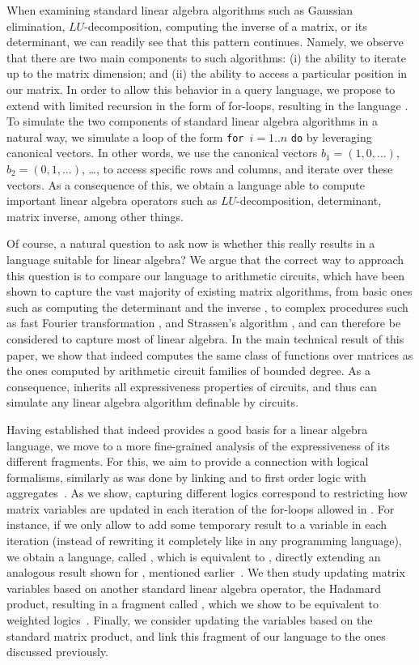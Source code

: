When examining standard linear algebra algorithms such as Gaussian elimination, $LU$-decomposition, computing the inverse of a matrix, or its determinant, we can readily see that this pattern continues. Namely, we observe that there are two main components to such algorithms: (i) the ability to iterate up to the matrix dimension; and (ii) the ability to access a particular position in our matrix. In order to allow this behavior in a query language, we propose to extend \lang with limited recursion in the form of for-loops, resulting in the language \langfor. To  simulate the two components of standard linear algebra algorithms in a natural way, we simulate a loop of the form \texttt{for}\, $i=1..n$ \texttt{do} by leveraging canonical vectors. In other words, we use the canonical vectors $b_1=(1,0,\ldots)$, $b_2=(0,1,\ldots)$, \ldots, to access specific rows and columns, and iterate over these vectors. As a consequence of this, we obtain a language able to compute important linear algebra operators such as $LU$-decomposition, determinant, matrix inverse, among other things.

Of course, a natural question to ask now is whether this really results in a language suitable for linear algebra? We argue that the correct way to approach this question is to compare our language to arithmetic circuits, which have been shown to capture the vast majority of existing matrix algorithms, from basic ones such as computing the determinant \cite{} and the inverse \cite{}, to complex procedures such as fast Fourier transformation \cite{}, and Strassen's algorithm \cite{}, and can therefore be considered to capture most of linear algebra. In the main technical result of this paper, we show that \langfor indeed computes the same class of functions over matrices as the ones computed by arithmetic circuit families of bounded degree.  As a consequence, \langfor inherits all expressiveness properties of circuits, and thus can simulate any linear algebra algorithm definable by circuits.

Having established that \langfor indeed provides a good basis for a linear algebra language, we move to a more fine-grained analysis of the expressiveness of its different fragments. For this, we aim to provide a connection with logical formalisms, similarly as was done by linking \lara and \lang to first order logic with aggregates~\cite{BarceloH0S20,matlang-journal}. As we show, capturing different logics correspond to restricting how matrix variables are updated in each iteration of the for-loops allowed in \langfor. For instance, if we only allow to add some temporary result to a variable in each iteration (instead of rewriting it completely like in any programming language), we obtain a language, called \langsum, which is equivalent to \rak, directly extending an analogous result shown for \lang, mentioned earlier~\cite{brijder2019matrices}. We then study updating matrix variables based on another standard linear algebra operator, the Hadamard product, resulting in a fragment called \langprod, which we show to be equivalent to weighted logics~\cite{DrosteG05}. Finally, we consider updating the variables based on the standard matrix product, and link this fragment of our language to the ones discussed 
previously.  

